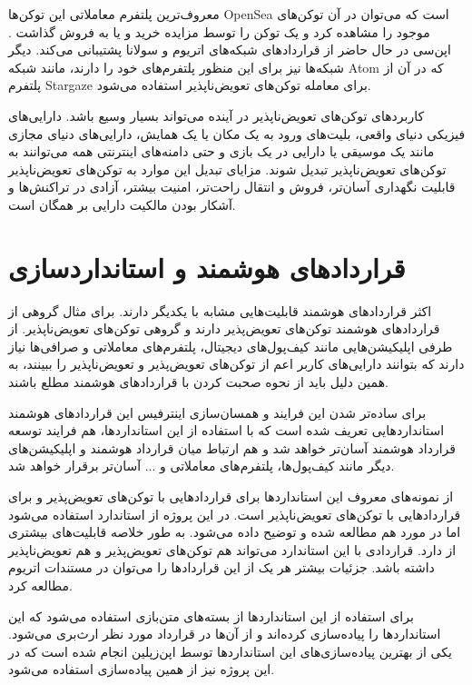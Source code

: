 معروف‌ترین پلتفرم معاملاتی این توکن‌ها
\gls{OpenSea}
است که می‌توان در آن توکن‌های موجود را مشاهده کرد و یک توکن را توسط مزایده خرید و یا به فروش گذاشت
\cite{OpenSeaDocs}.
اپن‌سی در حال حاضر از قراردادهای شبکه‌های اتریوم و سولانا پشتیبانی می‌کند.
دیگر شبکه‌ها نیز برای این منظور پلتفرم‌های خود را دارند، مانند شبکه
\gls{Atom}
که در آن از پلتفرم
\gls{Stargaze}
برای معامله توکن‌های تعویض‌ناپذیر استفاده می‌شود.

کاربردهای توکن‌های تعویض‌ناپذیر در آینده می‌تواند بسیار وسیع باشد.
دارایی‌های فیزیکی دنیای واقعی، بلیت‌های ورود به یک مکان یا یک همایش،
دارایی‌های دنیای مجازی مانند یک موسیقی یا دارایی در یک بازی
و حتی دامنه‌های اینترنتی همه می‌توانند به توکن‌های تعویض‌ناپذیر تبدیل شوند.
مزایای تبدیل این موارد به توکن‌های تعویض‌ناپذیر قابلیت نگهداری آسان‌تر،
فروش و انتقال راحت‌تر، امنیت بیشتر، آزادی در تراکنش‌ها
و آشکار بودن مالکیت دارایی بر همگان است.


\section{قرارداد‌های هوشمند و استانداردسازی}
اکثر قرارداد‌های هوشمند قابلیت‌هایی مشابه با یکدیگر دارند.
برای مثال گروهی از قرارداد‌های هوشمند توکن‌های تعویض‌پذیر دارند
و گروهی توکن‌های تعویض‌ناپذیر.
از طرفی اپلیکیشن‌هایی مانند کیف‌پول‌های دیجیتال،
پلتفرم‌های معاملاتی و صرافی‌ها
نیاز دارند که بتوانند دارایی‌های کاربر
اعم از توکن‌های تعویض‌پذیر و تعویض‌ناپذیر را ببینند،
به همین دلیل باید از نحوه صحبت کردن با قراردادهای هوشمند مطلع باشند.

برای ساده‌تر شدن این فرایند
و همسان‌سازی اینترفیس این قراردادهای هوشمند استانداردهایی تعریف شده است
که با استفاده از این استانداردها، هم فرایند توسعه قرارداد هوشمند آسان‌تر خواهد شد
و هم ارتباط میان قرارداد هوشمند و اپلیکیشن‌های دیگر مانند کیف‌پول‌ها، پلتفرم‌های معاملاتی و ... آسان‌تر برقرار خواهد شد.

از نمونه‌های معروف این استانداردها
برای قرارداد‌هایی با توکن‌های تعویض‌پذیر و
برای قراردادهایی با توکن‌های تعویض‌ناپذیر است. در این پروژه از استاندارد
استفاده می‌شود اما در مورد
هم مطالعه شده و توضیح داده می‌شود.
به طور خلاصه
قابلیت‌های بیشتری از
دارد.
قراردادی با این استاندارد می‌تواند هم توکن‌های تعویض‌پذیر و هم تعویض‌ناپذیر داشته باشد.
جزئیات بیشتر هر یک از این قراردادها را می‌توان در مستندات اتریوم
\cite{EthereumDocs}
مطالعه کرد.

برای استفاده از این استاندارد‌ها از بسته‌های متن‌بازی استفاده می‌شود که این استاندارد‌ها را پیاده‌سازی کرده‌اند
و از آن‌ها در قرارداد مورد نظر ارث‌بری می‌شود.
یکی از بهترین پیاده‌سازی‌های این استاندارد‌ها توسط اپن‌زپلین
\cite{ZeppelinDocs}
انجام شده است که در این پروژه نیز از همین پیاده‌سازی استفاده می‌شود.

